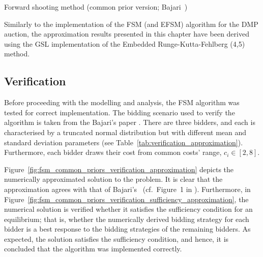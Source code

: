\begin{algorithm}
\caption{Forward shooting method (common prior version; Bajari~\cite{Bajari2001a})}
\label{alg:forward_shooting_method_approximation}
\begin{algorithmic}[1]
  \Statex
  \Statex
    \Let{$bids$}{$[guess, \bar{c})$}
    \Else
    \EndIf
  \EndWhile
  \Statex
\end{algorithmic}
\end{algorithm}

Similarly to the implementation of the FSM (and EFSM) algorithm for the DMP auction, the approximation results presented in this chapter have been derived using the GSL implementation of the Embedded Runge-Kutta-Fehlberg (4,5) method.


\subsection{Verification} %
\label{sub:verification}
Before proceeding with the modelling and analysis, the FSM algorithm was tested for correct implementation. The bidding scenario used to verify the algorithm is taken from the Bajari's paper \cite{Bajari2001a}. There are three bidders, and each is characterised by a truncated normal distribution but with different mean and standard deviation parameters (see Table~\ref{tab:verification_approximation}). Furthermore, each bidder draws their cost from common costs' range, $c_i\in [2,8]$.

Figure~\ref{fig:fsm_common_priors_verification_approximation} depicts the numerically approximated solution to the problem. It is clear that the approximation agrees with that of Bajari's~\cite{Bajari2001a} (cf.~Figure~1 in \cite{Bajari2001a}). Furthermore, in Figure~\ref{fig:fsm_common_priors_verification_sufficiency_approximation}, the numerical solution is verified whether it satisfies the sufficiency condition for an equilibrium; that is, whether the numerically derived bidding strategy for each bidder is a best response to the bidding strategies of the remaining bidders. As expected, the solution satisfies the sufficiency condition, and hence, it is concluded that the algorithm was implemented correctly.

